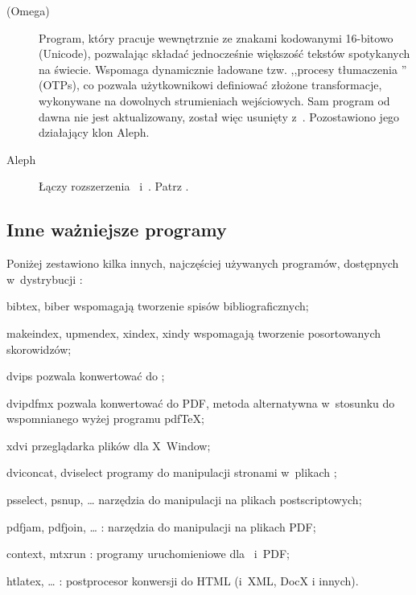 \documentclass{article}
\begin{document}
\begin{description}
\item [\OMEGA{} (Omega)] Program, który pracuje wewnętrznie ze znakami
kodowanymi 16-bitowo (Unicode), pozwalając składać jednocześnie
większość tekstów spotykanych na świecie. Wspomaga dynamicznie
ładowane tzw. ,,procesy tłumaczenia \OMEGA'' (OTPs), co pozwala
użytkownikowi definiować złożone transformacje, wykonywane na dowolnych
strumieniach wejściowych.
Sam program od dawna nie jest aktualizowany, został więc usunięty z~\TL.
Pozostawiono jego działający klon Aleph.

\item [Aleph] Łączy rozszerzenia \OMEGA\ i~\eTeX.
Patrz  .

\end{description}

\subsection{Inne ważniejsze programy \protect\TL}

Poniżej zestawiono kilka innych, najczęściej używanych programów, dostępnych
w~dystrybucji \TL{}:

\begin{cmddescription}

\item[bibtex, biber]  wspomagają tworzenie spisów bibliograficznych;

\item[makeindex,  upmendex, xindex, xindy] wspomagają tworzenie posortowanych skorowidzów;

\item[dvips]  pozwala konwertować \dvi{} do \PS{};

\item [dvipdfmx]  pozwala konwertować \dvi{} do PDF, metoda alternatywna w~stosunku
 do wspomnianego wyżej programu pdf\TeX{};
 
\item[xdvi]   przeglądarka plików \dvi{} dla X~Window;

\item [dviconcat, dviselect] programy do manipulacji stronami w~plikach
  \dvi{};

\item [psselect, psnup, \ldots] narzędzia do manipulacji na plikach
postscriptowych;

\item [pdfjam, pdfjoin, \ldots]: narzędzia do manipulacji na plikach
 PDF;

\item [context, mtxrun]:  programy uruchomieniowe dla \ConTeXt\ i~PDF;

\item [htlatex, \ldots ] : \AllTeX{} postprocesor konwersji do HTML (i~XML, DocX i innych).

\end{cmddescription}
\end{document}
